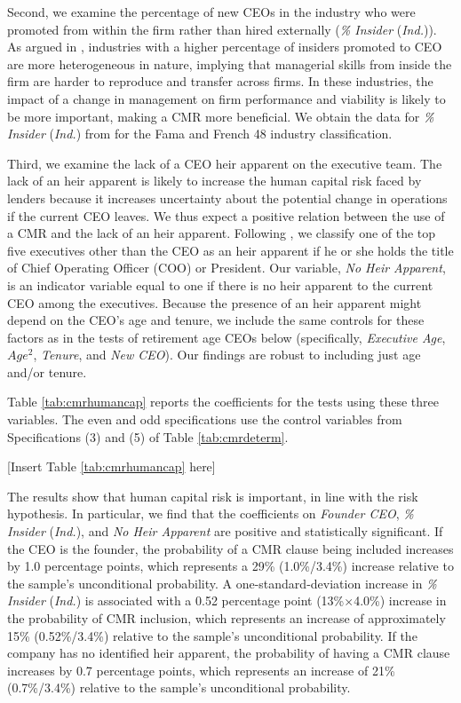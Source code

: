 \documentclass[a4paper,12pt]{article}
\begin{document}
Second, we examine the percentage of new CEOs in the industry who were promoted from within the firm rather than hired externally (\textit{\% Insider} (\textit{Ind.})).
As argued in \citet{Cremers_2014}, industries with a higher percentage of insiders promoted to CEO are more heterogeneous in nature, implying that managerial skills from inside the firm are harder to reproduce and transfer across firms.
In these industries, the impact of a change in management on firm performance and viability is likely to be more important, making a CMR more beneficial.
We obtain the data for \textit{\% Insider} (\textit{Ind.}) from \citet{Cremers_2014} for the Fama and French 48 industry classification.


Third, we examine the lack of a CEO heir apparent on the executive team.
The lack of an heir apparent is likely to increase the human capital risk faced by lenders because it increases uncertainty about the potential change in operations if the current CEO leaves.
We thus expect a positive relation between the use of a CMR and the lack of an heir apparent.
Following \citet{Fee_2003}, we classify one of the top five executives other than the CEO as an heir apparent if he or she holds the title of Chief Operating Officer (COO) or President.
Our variable, \textit{No Heir Apparent}, is an indicator variable equal to one if there is no heir apparent to the current CEO among the executives.
Because the presence of an heir apparent might depend on the CEO's age and tenure, we include the same controls for these factors as in the tests of retirement age CEOs below (specifically, \textit{Executive Age}, $Age^2$, \textit{Tenure}, and \textit{New CEO}).
Our findings are robust to including just age and/or tenure.



Table \ref{tab:cmrhumancap} reports the coefficients for the tests using these three variables.
The even and odd specifications use the control variables from Specifications (3) and (5) of Table \ref{tab:cmrdeterm}.


\begin{center}
    [Insert Table \ref{tab:cmrhumancap} here]
\end{center}

The results show that human capital risk is important, in line with the risk hypothesis.
In particular, we find that the coefficients on \textit{Founder CEO}, \textit{\% Insider} (\textit{Ind.}), and \textit{No Heir Apparent} are positive and statistically significant.
If the CEO is the founder, the probability of a CMR clause being included increases by 1.0 percentage points, which represents a 29\% (1.0\%/3.4\%) increase relative to the sample's unconditional probability.
A one-standard-deviation increase in \textit{\% Insider} (\textit{Ind.}) is associated with a 0.52 percentage point (13\%$\times$4.0\%) increase in the probability of CMR inclusion, which represents an increase of approximately 15\% (0.52\%/3.4\%) relative to the sample's unconditional probability.
If the company has no identified heir apparent, the probability of having a CMR clause increases by 0.7 percentage points, which represents an increase of 21\% (0.7\%/3.4\%) relative to the sample's unconditional probability.
\end{document}
